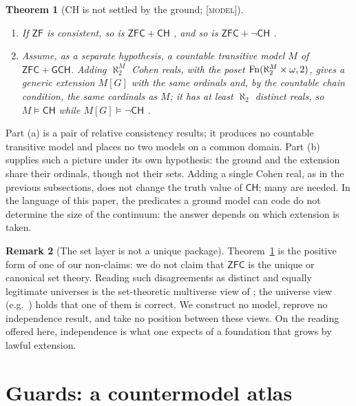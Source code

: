 \documentclass[11pt]{article}
\newcommand{\gradetag}[1]{\textnormal{\textsc{[#1]}}}
\newcommand{\modelg}{\gradetag{model}}
\newtheorem{theorem}{Theorem}[section]
\theoremstyle{definition}
\newtheorem{remark}[theorem]{Remark}
\begin{document}
\begin{theorem}[CH is not settled by the ground; \modelg]\label{thm:ch}
\begin{enumerate}[label=\textup{(\alph*)}]
\item If $\mathsf{ZF}$ is consistent, so is $\mathsf{ZFC}+\mathsf{CH}$
\citep{Godel1938,Godel1940}, and so is $\mathsf{ZFC}+\neg\mathsf{CH}$ \citep{Cohen1963}.
\item Assume, as a separate hypothesis, a countable transitive model $M$ of
$\mathsf{ZFC}+\mathsf{GCH}$. Adding $\aleph_2^M$ Cohen reals, with the poset
$\operatorname{Fn}(\aleph_2^M\times\omega,2)$, gives a generic extension $M[G]$ with the same ordinals and,
by the countable chain condition, the same cardinals as $M$; it has at least $\aleph_2$ distinct
reals, so $M\models\mathsf{CH}$ while $M[G]\models\neg\mathsf{CH}$
\citep{Kunen2011}.
\end{enumerate}
\end{theorem}

Part (a) is a pair of relative consistency results; it produces no countable transitive model and
places no two models on a common domain. Part (b) supplies such a picture under its own
hypothesis: the ground and the extension share their ordinals, though not their sets. Adding a
single Cohen real, as in the previous subsections, does not change the truth value of
$\mathsf{CH}$; many are needed. In the language of this paper, the predicates a ground model can
code do not determine the size of the continuum: the answer depends on which extension is taken.

\begin{remark}[The set layer is not a unique package]\label{rem:notunique}
Theorem~\ref{thm:ch} is the positive form of one of our non-claims: we do not claim that
$\mathsf{ZFC}$ is the unique or canonical set theory. Reading such disagreements as distinct and
equally legitimate universes is the set-theoretic multiverse view of \citet{Hamkins2012}; the
universe view (e.g.\ \citealp{Godel1947}) holds that one of them is correct. We construct no
model, reprove no independence result, and take no position between these views. On the reading
offered here, independence is what one expects of a foundation that grows by lawful extension.
\end{remark}
 \section{Guards: a countermodel atlas}\label{sec:atlas}
\end{document}
